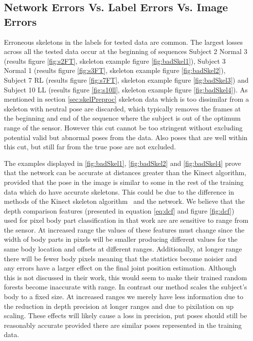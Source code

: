 \documentclass[11pt]{article} %
\begin{document}
\subsection{Network Errors Vs. Label Errors Vs. Image Errors}
\label{sec:errs}
Erroneous skeletons in the labels for tested data are common. The largest losses across all the tested data occur at the beginning of sequences Subject 2 Normal 3 (results figure \ref{fig:s2FT}, skeleton example figure \ref{fig:badSkel1}), Subject 3 Normal 1 (results figure \ref{fig:s3FT}, skeleton example figure \ref{fig:badSkel2}), Subject 7 RL (results figure \ref{fig:s7FT}, skeleton example figure \ref{fig:badSkel3}) and Subject 10 LL (results figure \ref{fig:s10ll}, skeleton example figure \ref{fig:badSkel4}). As mentioned in section \ref{sec:skelPreproc} skeleton data which is too dissimilar from a skeleton with neutral pose are discarded, which typically removes the frames at the beginning and end of the sequence where the subject is out of the optimum range of the sensor. However this cut cannot be too stringent without excluding potential valid but abnormal poses from the data. Also poses that are well within this cut, but still far from the true pose are not excluded. 

The examples displayed in \ref{fig:badSkel1}, \ref{fig:badSkel2} and \ref{fig:badSkel4} prove that the network can be accurate at distances greater than the Kinect algorithm, provided that the pose in the image is similar to some in the rest of the training data which do have accurate skeletons. This could be due to the difference in methods of the Kinect skeleton algorithm~\cite{Blake2011} and the network. We believe that the depth comparison features (presented in equation \ref{eq:dcf} and figure \ref{fig:dcf}) used for pixel body part classification in that work are are sensitive to range from the sensor. At increased range the values of these features must change since the width of body parts in pixels will be smaller producing different values for the same body location and offsets at different ranges. Additionally, at longer range there will be fewer body pixels meaning that the statistics become noisier and any errors have a larger effect on the final joint position estimation. Although this is not discussed in their work, this would seem to make their trained random forests become inaccurate with range. In contrast our method scales the subject's body to a fixed size. At increased ranges we merely have less information due to the reduction in depth precision at longer ranges and due to pixilation on up scaling. These effects will likely cause a loss in precision, put poses should still be reasonably accurate provided there are similar poses represented in the training data.
\end{document}
